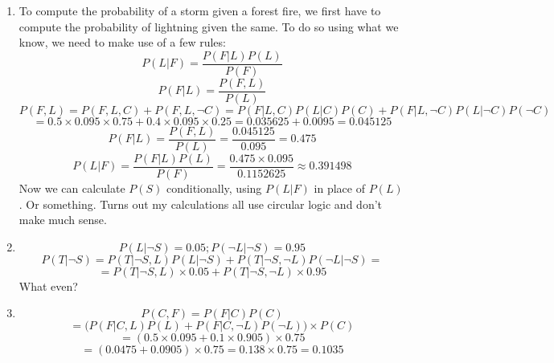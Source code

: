 \documentclass{article}
\begin{document}
\begin{enumerate}
\begin{enumerate}
        \item
            To compute the probability of a storm given a forest fire, we first have to compute the probability of lightning given the same.
            To do so using what we know, we need to make use of a few rules:
            $$P(L|F) = \frac{P(F|L)P(L)}{P(F)}$$
            $$P(F|L) = \frac{P(F,L)}{P(L)}$$
            $$P(F,L) = P(F,L,C) + P(F,L,\neg C) = P(F|L,C)P(L|C)P(C) + P(F|L,\neg C)P(L|\neg C)P(\neg C)$$
            $$ = 0.5\times0.095\times0.75 + 0.4\times0.095\times0.25 = 0.035625 + 0.0095 = 0.045125$$
            $$P(F|L) = \frac{P(F,L)}{P(L)} = \frac{0.045125}{0.095} = 0.475$$
            $$P(L|F) = \frac{P(F|L)P(L)}{P(F)} = \frac{0.475\times0.095}{0.1152625} \approx 0.391498 $$
            Now we can calculate $P(S)$ conditionally, using $P(L|F)$ in place of $P(L)$.
            Or something.  Turns out my calculations all use circular logic and don't make much sense.

        \item
            $$P(L|\neg S) = 0.05; P(\neg L|\neg S)=0.95$$
            $$P(T|\neg S) = P(T|\neg S, L)P(L|\neg S) + P(T|\neg S,\neg L)P(\neg L|\neg S) = $$
            $$ = P(T|\neg S, L)\times0.05 + P(T|\neg S,\neg L)\times0.95$$
            What even?

        \item
            $$P(C,F) = P(F|C)P(C)$$
            $$ = \Big ( P(F|C,L)P(L) + P(F|C,\neg L)P(\neg L) \Big ) \times P(C) $$
            $$ = ( 0.5\times0.095 + 0.1\times0.905 ) \times 0.75 $$
            $$ = (0.0475 + 0.0905) \times 0.75 = 0.138\times0.75 = 0.1035 $$
            

    \end{enumerate}
\end{enumerate}
\end{document}
